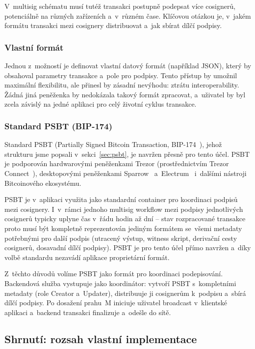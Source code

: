 V~multisig schématu musí tutéž transakci postupně podepsat více cosignerů,
potenciálně na různých zařízeních a~v~různém čase. Klíčovou otázkou je,
v~jakém formátu transakci mezi cosignery distribuovat a~jak sbírat
dílčí podpisy.

\subsubsection{Vlastní formát}

Jednou z~možností je definovat vlastní datový formát (například JSON),
který by obsahoval parametry transakce a~pole pro podpisy. Tento přístup
by umožnil maximální flexibilitu, ale přinesl by zásadní nevýhodu:
ztrátu interoperability. Žádná jiná peněženka by nedokázala takový formát
zpracovat, a~uživatel by byl zcela závislý na jedné aplikaci pro celý
životní cyklus transakce.

\subsubsection{Standard PSBT (BIP-174)}

Standard PSBT (Partially Signed Bitcoin Transaction,
BIP-174~\citep{BIP174}), jehož strukturu jsme popsali
v~sekci~\ref{sec:psbt}, je navržen přesně pro tento účel. PSBT
je podporován hardwarovými peněženkami Trezor (prostřednictvím Trezor
Connect~\citep{TrezorConnect}), desktopovými peněženkami
Sparrow~\citep{SparrowWallet} a~Electrum~\citep{Electrum} i~dalšími
nástroji Bitcoinového ekosystému.

PSBT je v~aplikaci využita jako standardní container pro koordinaci
podpisů mezi cosignery. I~v~rámci jednoho multisig workflow mezi
podpisy jednotlivých cosignerů typicky uplyne čas v~řádu hodin
až dní -- stav rozpracované transakce proto musí být kompletně
reprezentován jediným formátem se~všemi metadaty potřebnými
pro další podpis (utracený výstup, witness skript, derivační cesty
cosignerů, dosavadní dílčí podpisy). PSBT je pro tento účel přímo
navržen a~díky volbě standardu nezavádí aplikace proprietární
formát.

Z~těchto důvodů volíme PSBT jako formát pro koordinaci podepisování.
Backendová služba vystupuje jako koordinátor: vytvoří PSBT s~kompletními
metadaty (role Creator a~Updater), distribuuje ji cosignerům k~podpisu
a~sbírá dílčí podpisy. Po dosažení prahu~M iniciuje uživatel broadcast
v~klientské aplikaci a~backend transakci finalizuje a~odešle do sítě.


\subsection{Shrnutí: rozsah vlastní implementace}
\label{sec:analyza-rozsah}

